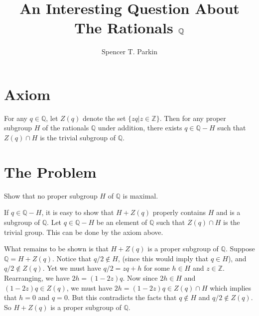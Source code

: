 \documentclass[12pt]{article}
\title{An Interesting Question About\\The Rationals $\Q$}
\author{Spencer T. Parkin}
\newcommand{\Q}{\mathbb{Q}}
\newcommand{\Z}{\mathbb{Z}}
\begin{document}
\maketitle

\section*{Axiom}

For any $q\in\Q$, let $Z(q)$ denote the set $\{zq|z\in\Z\}$.
Then for any proper subgroup $H$ of the rationals $\Q$ under addition,
there exists $q\in \Q-H$ such that $Z(q)\cap H$ is the trivial
subgroup of $\Q$.

\section*{The Problem}

Show that no proper subgroup $H$ of $\Q$ is maximal.

If $q\in\Q-H$, it is easy to show that $H+Z(q)$
properly contains $H$ and is a subgroup of $\Q$.
Let $q\in\Q-H$ be an element of $\Q$ such that $Z(q)\cap H$
is the trivial group.  This can be done by the axiom above.

What remains to be shown is that $H+Z(q)$ is a proper
subgroup of $\Q$.  Suppose $\Q=H+Z(q)$.
Notice that $q/2\not\in H$, (since this would imply that $q\in H$), and $q/2\not\in Z(q)$.
Yet we must have $q/2=zq+h$ for some $h\in H$ and $z\in\Z$.
Rearranging, we have $2h=(1-2z)q$.  Now since $2h\in H$
and $(1-2z)q\in Z(q)$, we must have $2h=(1-2z)q\in Z(q)\cap H$ which
implies that $h=0$ and $q=0$.  But this contradicts the facts that
$q\not\in H$ and $q/2\not\in Z(q)$.  So $H+Z(q)$ is a proper subgroup of $\Q$.
\end{document}
